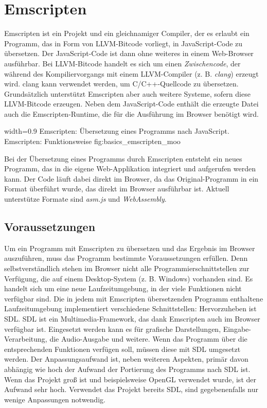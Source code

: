 \section{Emscripten}\label{emscripten}

Emscripten ist ein Projekt und ein gleichnamiger Compiler, der es
erlaubt ein Programm, das in Form von LLVM-Bitcode vorliegt,
in JavaScript-Code zu übersetzen. Der JavaScript-Code ist dann
ohne weiteres in einem Web-Browser ausführbar. Bei LLVM-Bitcode handelt
es sich um einen \emph{Zwischencode}, der während des Kompiliervorgangs
mit einem LLVM-Compiler (z. B. \emph{clang}) erzeugt wird. clang kann
verwendet werden, um C/C++-Quellcode zu übersetzen. Grundsätzlich
unterstützt Emscripten aber auch weitere Systeme, sofern diese
LLVM-Bitcode erzeugen. Neben dem JavaScript-Code enthält die erzeugte
Datei auch die Emscripten-Runtime, die für die Ausführung im Browser
benötigt wird.

   {width=0.9\textwidth}
   {Emscripten: Übersetzung eines Programms nach JavaScript.}
   {Emscripten: Funktionsweise}
   {fig:basics_emscripten_moo}

Bei der Übersetzung eines Programms durch Emscripten entsteht ein neues
Programm, das in die eigene Web-Applikation integriert und aufgerufen
werden kann. Der Code läuft dabei direkt im Browser, da das
Original-Programm in ein Format überführt wurde, das direkt im Browser
ausführbar ist. Aktuell unterstütze Formate sind \emph{asm.js} und
\emph{WebAssembly}.

\subsection{Voraussetzungen}\label{voraussetzungen}

Um ein Programm mit Emscripten zu übersetzen und das Ergebnis im Browser
auszuführen, muss das Programm bestimmte Voraussetzungen erfüllen. Denn
selbstverständlich stehen im Browser nicht alle
Programmierschnittstellen zur Verfügung, die auf einem Desktop-System
(z. B. Windows) vorhanden sind. Es handelt sich um eine neue
Laufzeitumgebung, in der viele Funktionen nicht verfügbar sind. Die in
jedem mit Emscripten übersetzenden Programm enthaltene Laufzeitumgebung
implementiert verschiedene Schnittstellen:
Hervorzuheben ist SDL. SDL ist ein Multimedia-Framework, das dank
Emscripten auch im Browser verfügbar ist. Eingesetzt werden kann es für
grafische Darstellungen, Eingabe-Verarbeitung, die Audio-Ausgabe und
weitere. Wenn das Programm über die entsprechenden Funktionen verfügen
soll, müssen diese mit SDL umgesetzt werden. Der Anpassungsaufwand ist,
neben weiteren Aspekten, primär davon abhängig wie hoch der Aufwand der
Portierung des Programms nach SDL ist. Wenn das Projekt groß ist und beispielsweise
OpenGL verwendet wurde, ist der Aufwand sehr hoch. Verwendet das Projekt
bereits SDL, sind gegebenenfalls nur wenige Anpassungen notwendig.

